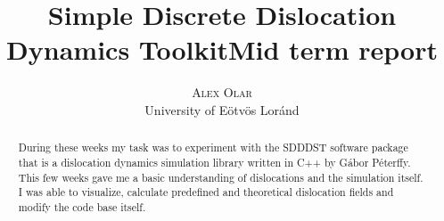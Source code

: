 \documentclass[12pt,a4paper]{article}
\title{Simple Discrete Dislocation Dynamics Toolkit\newline\textbf{Mid term report}}
\author{\Large{\textsc{Alex Olar}} \vspace{10pt}\\
	\textrm{University of Eötvös Loránd}
	}
\date{}
\theoremstyle{plain}
\begin{document}
\maketitle

\newpage

\tableofcontents

\vfill

\begin{abstract}
	During these weeks my task was to experiment with the
	SDDDST software package that is a dislocation dynamics
	simulation library written in C++ by Gábor Péterffy. This
	few weeks gave me a basic understanding of dislocations and the
	simulation itself. I was able to visualize, calculate predefined and
	theoretical dislocation fields and modify the code base itself.
\end{abstract}

\newpage
\end{document}
